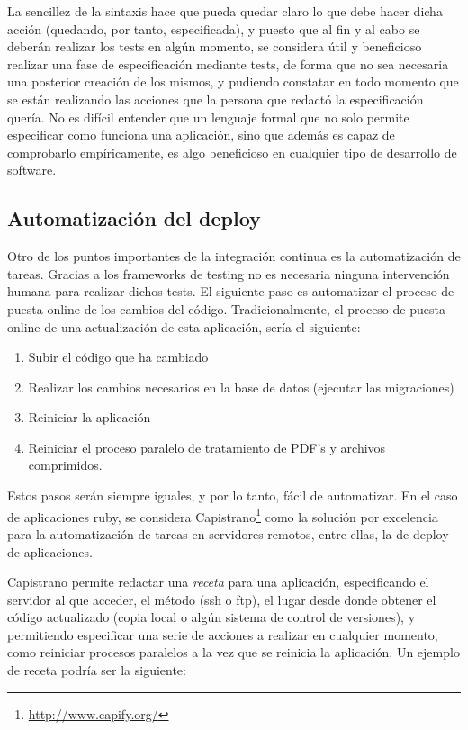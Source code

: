 La sencillez de la sintaxis hace que pueda quedar claro lo que debe hacer dicha acción (quedando, por tanto, especificada), y puesto que al fin y al cabo se deberán realizar los tests en algún momento, se considera útil y beneficioso realizar una fase de especificación mediante tests, de forma que no sea necesaria una posterior creación de los mismos, y pudiendo constatar en todo momento que se están realizando las acciones que la persona que redactó la especificación quería. No es difícil entender que un lenguaje formal que no solo permite especificar como funciona una aplicación, sino que además es capaz de comprobarlo empíricamente, es algo beneficioso en cualquier tipo de desarrollo de software.



\subsection{Automatización del deploy} %
\label{sub:automatización_del_deploy}

Otro de los puntos importantes de la integración continua es la automatización de tareas. Gracias a los frameworks de testing no es necesaria ninguna intervención humana para realizar dichos tests. El siguiente paso es automatizar el proceso de puesta online de los cambios del código. Tradicionalmente, el proceso de puesta online de una actualización de esta aplicación, sería el siguiente:

\begin{enumerate}
	\item Subir el código que ha cambiado
	\item Realizar los cambios necesarios en la base de datos (ejecutar las migraciones)
	\item Reiniciar la aplicación
	\item Reiniciar el proceso paralelo de tratamiento de PDF's y archivos comprimidos.
\end{enumerate}

Estos pasos serán siempre iguales, y por lo tanto, fácil de automatizar. En el caso de aplicaciones ruby, se considera Capistrano\footnote{\url{http://www.capify.org/}} como la solución por excelencia para la automatización de tareas en servidores remotos, entre ellas, la de deploy de aplicaciones.

Capistrano permite redactar una \emph{receta} para una aplicación, especificando el servidor al que acceder, el método (ssh o ftp), el lugar desde donde obtener el código actualizado (copia local o algún sistema de control de versiones), y permitiendo especificar una serie de acciones a realizar en cualquier momento, como reiniciar procesos paralelos a la vez que se reinicia la aplicación. Un ejemplo de receta podría ser la siguiente:

